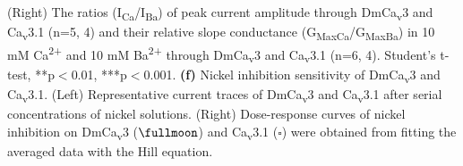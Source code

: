 (Right) The ratios (I\textsubscript{Ca}/I\textsubscript{Ba}) of peak current amplitude through DmCa\textsubscript{v}3 and Ca\textsubscript{v}3.1 (n=5, 4) and their relative slope conductance (G\textsubscript{MaxCa}/G\textsubscript{MaxBa}) in 10 mM Ca\textsuperscript{2+} and 10 mM Ba\textsuperscript{2+} through DmCa\textsubscript{v}3 and Ca\textsubscript{v}3.1 (n=6, 4). Student's t-test, **p$<$0.01, ***p$<$0.001.
{\bf(f)} Nickel inhibition sensitivity of DmCa\textsubscript{v}3 and Ca\textsubscript{v}3.1. 
(Left) Representative current traces of DmCa\textsubscript{v}3 and Ca\textsubscript{v}3.1 after serial concentrations of nickel solutions. 
(Right) Dose-response curves of nickel inhibition on DmCa\textsubscript{v}3 ($\fullmoon$) and Ca\textsubscript{v}3.1 ($\square$) were obtained from fitting the averaged data with the Hill equation.

  
  
  
  
  
  
  
  
  
  
  
  
  
  
  
  
  
  
  
  